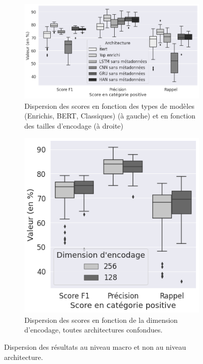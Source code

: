 \begin{figure}[ht]
        \begin{subfigure}{0.65\textwidth}
            \centering
            \includegraphics[width=\linewidth]{figures/chap4/main-lineartop5vstheworld.png}
            \caption{Dispersion des scores en fonction des types de modèles (Enrichis, BERT, Classiques) (à gauche) et en fonction des tailles d'encodage (à droite)}
            \label{fig:chap4:main-results-dispersion-encoder}
        \end{subfigure} \hfill %
        \begin{subfigure}{0.30\linewidth}%
            \centering
            \includegraphics[width=\linewidth]{figures/chap4/main-encodingdimension.png}
            \caption{Dispersion des scores en fonction de la dimension d'encodage, toutes architectures confondues.}
            \label{fig:chap4:main-results-dispersion-dimension}
        \end{subfigure}
        \caption{Dispersion des résultats au niveau macro et non au niveau architecture.}
\end{figure}%
    \clearpage

